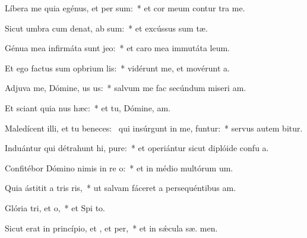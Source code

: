 \item Líbera me quia egénus, et per  sum:~* et cor meum contur  tra me.
\item Sicut umbra cum denat, ab sum:~* et excússus sum  tæ.
\item Génua mea infirmáta sunt  jeo:~* et caro mea immutáta   leum.
\item Et ego factus sum opbrium lis:~* vidérunt me, et movérunt  a.
\item Adjuva me, Dómine, us us:~* salvum me fac secúndum miseri am.
\item Et sciant quia nus  hæc:~* et tu, Dómine,  am.
\item Maledícent illi, et tu beneces:~\pscross{} qui insúrgunt in me, funtur:~* servus autem  bitur.
\item Induántur qui détrahunt hi, pure:~* et operiántur sicut diplóide confu a.
\item Confitébor Dómino nimis in re o:~* et in médio multórum  um.
\item Quia ástitit a tris ris,~* ut salvam fáceret a persequéntibus  am.
\item Glória tri, et o,~* et Spi to.
\item Sicut erat in princípio, et , et per,~* et in sǽcula sæ. men.
